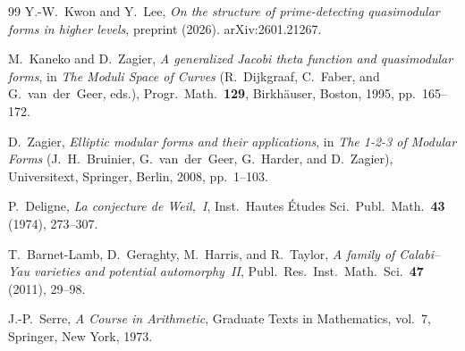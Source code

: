 \documentclass[11pt]{article}
\begin{document}
\begin{thebibliography}{99}
Y.-W.~Kwon and Y.~Lee,
\emph{On the structure of prime-detecting quasimodular forms in higher levels},
preprint (2026).
\newblock arXiv:2601.21267.

M.~Kaneko and D.~Zagier,
\emph{A generalized Jacobi theta function and quasimodular forms},
in \textit{The Moduli Space of Curves}
  (R.~Dijkgraaf, C.~Faber, and G.~van~der~Geer, eds.),
Progr.\ Math.\ \textbf{129}, Birkh\"auser, Boston, 1995, pp.~165--172.

D.~Zagier,
\emph{Elliptic modular forms and their applications},
in \textit{The 1-2-3 of Modular Forms}
  (J.~H.~Bruinier, G.~van~der~Geer, G.~Harder, and D.~Zagier),
Universitext, Springer, Berlin, 2008, pp.~1--103.

P.~Deligne,
\emph{La conjecture de Weil,~I},
Inst.\ Hautes \'Etudes Sci.\ Publ.\ Math.\ \textbf{43} (1974), 273--307.

T.~Barnet-Lamb, D.~Geraghty, M.~Harris, and R.~Taylor,
\emph{A family of Calabi--Yau varieties and potential automorphy~II},
Publ.\ Res.\ Inst.\ Math.\ Sci.\ \textbf{47} (2011), 29--98.

J.-P.~Serre,
\emph{A Course in Arithmetic},
Graduate Texts in Mathematics, vol.~7, Springer, New York, 1973.

\end{thebibliography}


\end{document}
